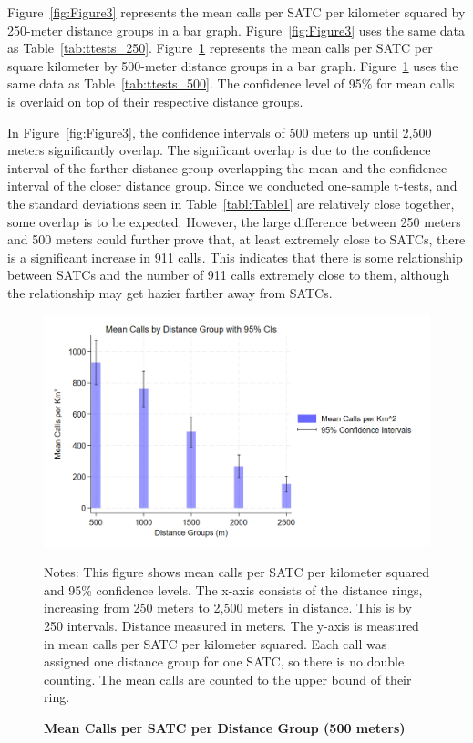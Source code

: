 \documentclass[12pt]{article}
\begin{document}
Figure~\ref{fig:Figure3} represents the mean calls per SATC per kilometer squared by 250-meter distance groups in a bar graph. Figure~\ref{fig:Figure3} uses the same data as Table~\ref{tab:ttests_250}. Figure~\ref{fig:Figure4} represents the mean calls per SATC per square kilometer by 500-meter distance groups in a bar graph. Figure~\ref{fig:Figure4} uses the same data as Table~\ref{tab:ttests_500}. The confidence level of 95\% for mean calls is overlaid on top of their respective distance groups. 

In Figure~\ref{fig:Figure3}, the confidence intervals of 500 meters up until 2,500 meters significantly overlap. The significant overlap is due to the confidence interval of the farther distance group overlapping the mean and the confidence interval of the closer distance group. Since we conducted one-sample t-tests,  and the standard deviations seen in Table~\ref{tabl:Table1} are relatively close together, some overlap is to be expected. However, the large difference between 250 meters and 500 meters could further prove that, at least extremely close to SATCs, there is a significant increase in 911 calls. This indicates that there is some relationship between SATCs and the number of 911 calls extremely close to them, although the relationship may get hazier farther away from SATCs.

\begin{figure}[H]
    \centering
\includegraphics[width=0.75\linewidth]{Reproducibility Package/Downloaded_calls/Visual_Graphics_Downloaded_calls/500_CI_Graph.png}
    \caption{\textbf{Mean Calls per SATC per Distance Group (500 meters)}}
    \label{fig:Figure4}
    \centering\small{Notes: This figure shows mean calls per SATC per kilometer squared and 95\% confidence levels. The x-axis consists of the distance rings, increasing from 250 meters to 2,500 meters in distance. This is by 250 intervals. Distance measured in meters. The y-axis is measured in mean calls per SATC per kilometer squared. Each call was assigned one distance group for one SATC, so there is no double counting. The mean calls are counted to the upper bound of their ring.}
\end{figure}
\end{document}
